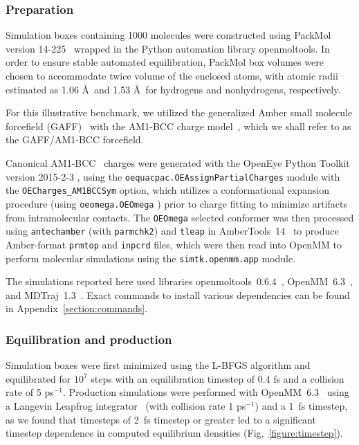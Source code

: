 \documentclass[aps,pre,twocolumn,nofootinbib,superscriptaddress,linenumbers]{revtex4-1}
\begin{document}
\subsubsection{Preparation}
\label{section:preparation}

Simulation boxes containing 1000 molecules were constructed using PackMol version 14-225~\cite{martinez2009packmol, packmolurl} wrapped in the Python automation library openmoltools.
In order to ensure stable automated equilibration, PackMol box volumes were chosen to accommodate twice volume of the enclosed atoms, with atomic radii estimated as 1.06 \AA\ and 1.53 \AA\ for hydrogens and nonhydrogens, respectively.  

For this illustrative benchmark, we utilized the generalized Amber small molecule forcefield (GAFF)~\cite{gaff,gaff2} with the AM1-BCC charge model~\cite{am1bcc1,am1bcc2}, which we shall refer to as the GAFF/AM1-BCC forcefield.

Canonical AM1-BCC~\cite{am1bcc1,am1bcc2, velez2014time} charges were generated with the OpenEye Python Toolkit version 2015-2-3 \cite{openeye}, using the {\tt oequacpac.OEAssignPartialCharges} module with the {\tt OECharges\_AM1BCCSym} option, which utilizes a conformational expansion procedure (using {\tt oeomega.OEOmega} \cite{hawkins2012conformer}) prior to charge fitting to minimize artifacts from intramolecular contacts.  
The {\tt OEOmega} selected conformer was then processed using {\tt antechamber} (with {\tt parmchk2}) and {\tt tleap} in AmberTools~14~\cite{amber14} to produce Amber-format {\tt prmtop} and {\tt inpcrd} files, which were then read into OpenMM to perform molecular simulations using the {\tt simtk.openmm.app} module.

The simulations reported here used libraries openmoltools~0.6.4~\cite{openmoltools}, OpenMM~6.3~\cite{eastman2012openmm}, and MDTraj~1.3~\cite{mcgibbon2014mdtraj}.  
Exact commands to install various dependencies can be found in Appendix~\ref{section:commands}.

\subsubsection{Equilibration and production}
\label{section:production}

Simulation boxes were first minimized using the L-BFGS algorithm \cite{liu1989limited} and equilibrated for $10^7$ steps with an equilibration timestep of 0.4 fs and a collision rate of 5 ps$^{-1}$.  
Production simulations were performed with OpenMM~6.3~\cite{eastman2012openmm} using a Langevin Leapfrog integrator~\cite{izaguirre-sweet-pande:psb:2010:langevin-leapfrog} (with collision rate 1 ps$^{-1}$) and a 1~fs timestep, as we found that timesteps of 2~fs timestep or greater led to a significant timestep dependence in computed equilibrium densities (Fig.~\ref{figure:timestep}).  
\end{document}
